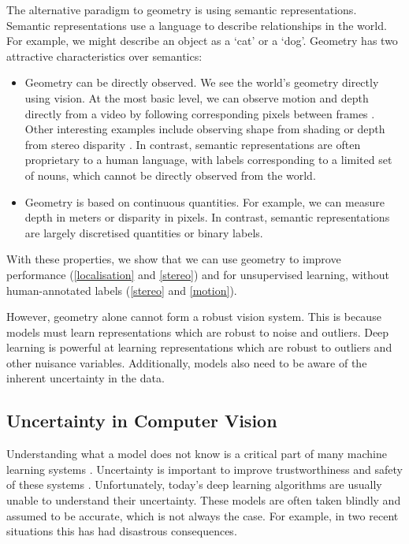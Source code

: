 The alternative paradigm to geometry is using semantic representations. 
Semantic representations use a language to describe relationships in the world. For example, we might describe an object as a `cat' or a `dog'.
Geometry has two attractive characteristics over semantics:
\begin{itemize}
\item Geometry can be directly observed. We see the world's geometry directly using vision.  At the most basic level, we can observe motion and depth directly from a video by following corresponding pixels between frames \citep{koenderink1991affine}.  Other interesting examples include observing shape from shading \citep{horn1989shape} or depth from stereo disparity \citep{scharstein2002taxonomy}. In contrast, semantic representations are often proprietary to a human language, with labels corresponding to a limited set of nouns, which cannot be directly observed from the world.
\item Geometry is based on continuous quantities. For example, we can measure depth in meters or disparity in pixels. In contrast, semantic representations are largely discretised quantities or binary labels.
\end{itemize}
With these properties, we show that we can use geometry to improve performance (\cref{localisation} and \cref{stereo}) and for unsupervised learning, without human-annotated labels (\cref{stereo} and \cref{motion}).

However, geometry alone cannot form a robust vision system. This is because models must learn representations which are robust to noise and outliers. Deep learning is powerful at learning representations which are robust to outliers and other nuisance variables. Additionally, models also need to be aware of the inherent uncertainty in the data.

\subsection{Uncertainty in Computer Vision}

Understanding what a model does not know is a critical part of many machine learning systems \citep{ghahramani2015probabilistic}. Uncertainty is important to improve trustworthiness and safety of these systems \citep{mcallister2017av_bdl}. Unfortunately, today's deep learning algorithms are usually unable to understand their uncertainty. These models are often taken blindly and assumed to be accurate, which is not always the case. For example, in two recent situations this has had disastrous consequences.

